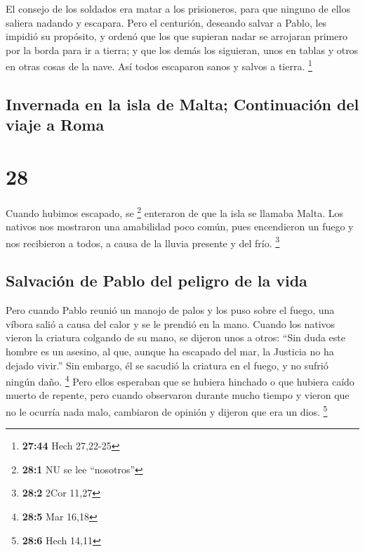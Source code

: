  El consejo de los soldados era matar a los prisioneros,
para que ninguno de ellos saliera nadando y escapara. 
Pero el centurión, deseando salvar a Pablo, les impidió su propósito, y
ordenó que los que supieran nadar se arrojaran primero por la borda para
ir a tierra;  y que los demás los siguieran, unos en
tablas y otros en otras cosas de la nave. Así todos escaparon sanos y
salvos a tierra. \footnote{\textbf{27:44} Hech 27,22-25}

\hypertarget{invernada-en-la-isla-de-malta-continuaciuxf3n-del-viaje-a-roma}{%
\subsection{Invernada en la isla de Malta; Continuación del viaje a
Roma}\label{invernada-en-la-isla-de-malta-continuaciuxf3n-del-viaje-a-roma}}

\hypertarget{section-27}{%
\section{28}\label{section-27}}

 Cuando hubimos escapado, se \footnote{\textbf{28:1} NU se
  lee ``nosotros''} enteraron de que la isla se llamaba Malta.
 Los nativos nos mostraron una amabilidad poco común, pues
encendieron un fuego y nos recibieron a todos, a causa de la lluvia
presente y del frío. \footnote{\textbf{28:2} 2Cor 11,27}

\hypertarget{salvaciuxf3n-de-pablo-del-peligro-de-la-vida}{%
\subsection{Salvación de Pablo del peligro de la
vida}\label{salvaciuxf3n-de-pablo-del-peligro-de-la-vida}}

 Pero cuando Pablo reunió un manojo de palos y los puso
sobre el fuego, una víbora salió a causa del calor y se le prendió en la
mano.  Cuando los nativos vieron la criatura colgando de
su mano, se dijeron unos a otros: ``Sin duda este hombre es un asesino,
al que, aunque ha escapado del mar, la Justicia no ha dejado vivir.''
 Sin embargo, él se sacudió la criatura en el fuego, y no
sufrió ningún daño. \footnote{\textbf{28:5} Mar 16,18} 
Pero ellos esperaban que se hubiera hinchado o que hubiera caído muerto
de repente, pero cuando observaron durante mucho tiempo y vieron que no
le ocurría nada malo, cambiaron de opinión y dijeron que era un dios.
\footnote{\textbf{28:6} Hech 14,11}

